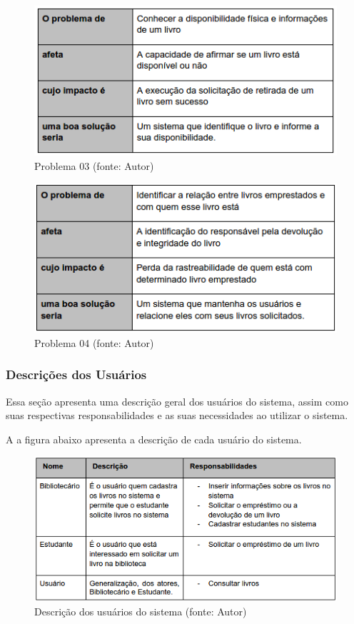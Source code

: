 \begin{figure}[!h]
\centering
\includegraphics[scale=0.65, angle = 360]{figuras/descricao_problema3}
\caption[]{Problema 03 (fonte: Autor)}
\label{Problema 03}
\end{figure}
\FloatBarrier

\begin{figure}[!h]
\centering
\includegraphics[scale=0.65, angle = 360]{figuras/descricao_problema4}
\caption[]{Problema 04 (fonte: Autor)}
\label{Problema 04}
\end{figure}
\FloatBarrier

\subsubsection{Descrições dos Usuários}
Essa seção apresenta uma descrição geral dos usuários do sistema, assim como suas respectivas responsabilidades e as suas necessidades ao utilizar o sistema.

A a figura abaixo apresenta a descrição de cada usuário do sistema.

\begin{figure}[!h]
\centering
\includegraphics[scale=0.65, angle = 360]{figuras/descricao_usuarios_soft}
\caption[]{Descrição dos usuários do sistema (fonte: Autor)}
\label{Descrição dos usuários do sistema}
\end{figure}
\FloatBarrier

